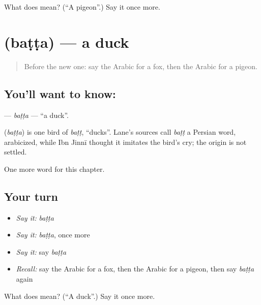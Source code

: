 \begin{tcolorbox}[breakable,colback=teal!4,colframe=teal!35!black,title={Before you move on}]
What does  mean? (\textquotedblleft{}A pigeon\textquotedblright{}.) Say it once more.
\end{tcolorbox}
\section[\texorpdfstring{\ar{بطة} (baṭṭa)}{بطة (baṭṭa)}]{ (baṭṭa) — a duck}

\label{lesson:AR-C135-batta}



\begin{quote}
Before the new one: say the Arabic for a fox, then the Arabic for a pigeon.
\end{quote}

\subsection*{You'll want to know: }
\textbf{} — \emph{baṭṭa} — \textquotedblleft{}a duck\textquotedblright{}.

\begin{cousinweb}
\textbf{} (\emph{baṭṭa}) is one bird of \emph{baṭṭ}, \textquotedblleft{}ducks\textquotedblright{}. Lane's sources call \emph{baṭṭ} a Persian word, arabicized, while Ibn Jinnī thought it imitates the bird's cry; the origin is not settled.
\end{cousinweb}

\begin{grammarlens}[title={What you've built}]
One more word for this chapter.
\end{grammarlens}

\subsection*{Your turn}
\begin{itemize}
\raggedright
  \item \emph{Say it:} \emph{baṭṭa}
  \item \emph{Say it:} \emph{baṭṭa}, once more
  \item \emph{Say it:} say \emph{baṭṭa}
  \item \emph{Recall:} say the Arabic for a fox, then the Arabic for a pigeon, then say \emph{baṭṭa} again
\end{itemize}

\begin{tcolorbox}[breakable,colback=teal!4,colframe=teal!35!black,title={Before you move on}]
What does  mean? (\textquotedblleft{}A duck\textquotedblright{}.) Say it once more.
\end{tcolorbox}
